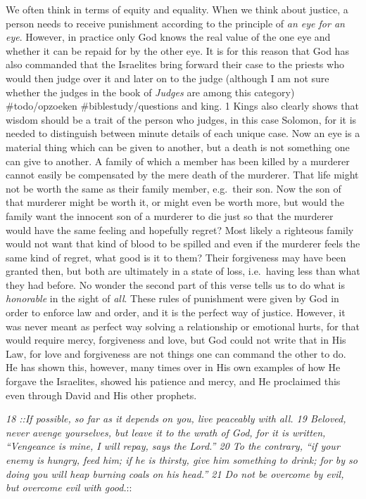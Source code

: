 We often think in terms of equity and equality. When we think about
justice, a person needs to receive punishment according to the principle
of \emph{an eye for an eye}. However, in practice only God knows the
real value of the one eye and whether it can be repaid for by the other
eye. It is for this reason that God has also commanded that the
Israelites bring forward their case to the priests who would then judge
over it and later on to the judge (although I am not sure whether the
judges in the book of \emph{Judges} are among this category)
\#todo/opzoeken \#biblestudy/questions and king. 1 Kings also clearly
shows that wisdom should be a trait of the person who judges, in this
case Solomon, for it is needed to distinguish between minute details of
each unique case. Now an eye is a material thing which can be given to
another, but a death is not something one can give to another. A family
of which a member has been killed by a murderer cannot easily be
compensated by the mere death of the murderer. That life might not be
worth the same as their family member, e.g.~their son. Now the son of
that murderer might be worth it, or might even be worth more, but would
the family want the innocent son of a murderer to die just so that the
murderer would have the same feeling and hopefully regret? Most likely a
righteous family would not want that kind of blood to be spilled and
even if the murderer feels the same kind of regret, what good is it to
them? Their forgiveness may have been granted then, but both are
ultimately in a state of loss, i.e.~having less than what they had
before. No wonder the second part of this verse tells us to do what is
\emph{honorable} in the sight of \emph{all}. These rules of punishment
were given by God in order to enforce law and order, and it is the
perfect way of justice. However, it was never meant as perfect way
solving a relationship or emotional hurts, for that would require mercy,
forgiveness and love, but God could not write that in His Law, for love
and forgiveness are not things one can command the other to do. He has
shown this, however, many times over in His own examples of how He
forgave the Israelites, showed his patience and mercy, and He proclaimed
this even through David and His other prophets.

\emph{18 ::If possible, so far as it depends on you, live peaceably with
all. 19 Beloved, never avenge yourselves, but leave it to the wrath of
God, for it is written, ``Vengeance is mine, I will repay, says the
Lord.'' 20 To the contrary, ``if your enemy is hungry, feed him; if he
is thirsty, give him something to drink; for by so doing you will heap
burning coals on his head.'' 21 Do not be overcome by evil, but overcome
evil with good.}::

